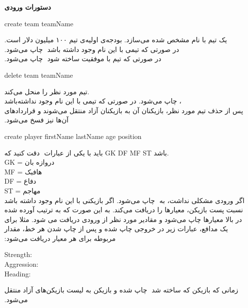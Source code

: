 \documentclass[]{article}
\begin{document}
\textbf{‫دﺳﺘﻮرات ورودی‬}
\begin{tcolorbox}[boxrule=0pt]
	\begin{latin}
		\large{
			‫‪create team teamName‬‬
		}
	\end{latin}
\end{tcolorbox}
‫ﯾﮏ ﺗﯿﻢ ﺑﺎ ﻧﺎم ﻣﺸﺨﺺ ﺷﺪه ﻣﯽﺳﺎزد‪ .‬ﺑﻮدﺟﻪی اوﻟﯿﻪی ﺗﯿﻢ ‪ ۱۰۰‬ﻣﯿﻠﯿﻮن دﻻر اﺳﺖ‪.‬‬
\\
‫در ﺻﻮرﺗﯽ ﮐﻪ ﺗﯿﻤﯽ ﺑﺎ اﯾﻦ ﻧﺎم وﺟﻮد داﺷﺘﻪ ﺑﺎﺷﺪ ‪  ‬ﭼﺎپ ﻣﯽﺷﻮد‪.‬‬
\\
‫در ﺻﻮرﺗﯽ ﮐﻪ ﺗﯿﻢ ﺑﺎ ﻣﻮﻓﻘﯿﺖ ﺳﺎﺧﺘﻪ ﺷﻮد ‪ ‬ﭼﺎپ ﻣﯽﺷﻮد‪.‬‬

\hrulefill

\begin{tcolorbox}[boxrule=0pt]
	\begin{latin}
		\large{
			‫‪delete team teamName‬‬
		}
	\end{latin}
\end{tcolorbox}
ﺗﯿﻢ ﻣﻮرد ﻧﻈﺮ را ﻣﻨﺤﻞ ﻣﯽﮐﻨﺪ.‪ \\ ‬در ﺻﻮرﺗﯽ ﮐﻪ ﺗﯿﻤﯽ ﺑﺎ اﯾﻦ ﻧﺎم وﺟﻮد ﻧﺪاﺷﺘﻪﺑﺎﺷﺪ 
‪  ،‬ﭼﺎپ ﻣﯽﺷﻮد‪.‬‬
\\
‫ﭘﺲ از ﺣﺬف ﺗﯿﻢ ﻣﻮرد ﻧﻈﺮ‪ ،‬ﺑﺎزﯾﮑﻨﺎن آن ﺑﻪ ﺑﺎزﯾﮑﻨﺎن آزاد ﻣﻨﺘﻘﻞ ﻣﯽﺷﻮﻧﺪ و ﻗﺮاردادﻫﺎی آنﻫﺎ ﻧﯿﺰ ﻓﺴﺦ ﻣﯽﺷﻮد‪.‬‬

\hrulefill
\begin{tcolorbox}[boxrule=0pt]
	\begin{latin}
		\large{
			‫‪create player firstName lastName age position‬‬
		}
	\end{latin}
\end{tcolorbox}
دﻗﺖ ﮐﻨﯿﺪ ﮐﻪ ‪  ﺑﺎﯾﺪ ﺑﺎ ﯾﮑﯽ از ﻋﺒﺎرات GK DF MF ST  باشد.
\\GK = دروازه بان
\\MF = هافبک
\\DF = دفاع
\\ST = مهاجم 
‫\\اﮔﺮ ﺑﺎزﯾﮑﻨﯽ ﺑﺎ اﯾﻦ ﻧﺎم وﺟﻮد داﺷﺘﻪ ﺑﺎﺷﺪ ‪ ‬ﭼﺎپ ﻣﯽﺷﻮد‪.‬‬
‫اﮔﺮ ورودی ﻣﺸﮑﻠﯽ ﻧﺪاﺷﺖ‪ ،‬ﺑﻪ ﻧﺴﺒﺖ ﭘﺴﺖ ﺑﺎزﯾﮑﻦ‪ ،‬ﻣﻌﯿﺎرﻫﺎ را درﯾﺎﻓﺖ ﻣﯽﮐﻨﺪ‪ .‬ﺑﻪ اﯾﻦ ﺻﻮرت ﮐﻪ ﺑﻪ ﺗﺮﺗﯿﺐ آورده ﺷﺪه در ﺑﺎﻻ ﻣﻌﯿﺎرﻫﺎ ﭼﺎپ ﻣﯽﺷﻮد و ﻣﻘﺎدﯾﺮ ﻣﻮرد ﻧﻈﺮ از ورودی درﯾﺎﻓﺖ ﻣﯽ ﺷﻮد‪ .‬ﻣﺜﻼ ﺑﺮای ﯾﮏ ﻣﺪاﻓﻊ‪ ،‬ﻋﺒﺎرات زﯾﺮ در ﺧﺮوﺟﯽ ﭼﺎپ ﺷﺪه و‬
‫ﭘﺲ از ﭼﺎپ ﺷﺪن ﻫﺮ ﺧﻂ‪ ،‬ﻣﻘﺪار ﻣﺮﺑﻮﻃﻪ ﺑﺮای ﻫﺮ ﻣﻌﯿﺎر درﯾﺎﻓﺖ ﻣﯽﺷﻮد‪:‬‬
\begin{tcolorbox}[boxrule=0pt]
	\begin{latin}
		\large{
			Strength:‬‬\\
			‫‪Aggression:‬‬\\
			‫‪Heading:‬‬
		}
	\end{latin}
\end{tcolorbox}
‫زﻣﺎﻧﯽ ﮐﻪ ﺑﺎزﯾﮑﻦ ﮐﻪ ﺳﺎﺧﺘﻪ ﺷﺪ ‪ ‬ﭼﺎپ ﺷﺪه و ﺑﺎزﯾﮑﻦ ﺑﻪ ﻟﯿﺴﺖ ﺑﺎزﯾﮑﻦﻫﺎی آزاد ﻣﻨﺘﻘﻞ ﻣﯽﺷﻮد‪.‬‬
\end{document}
